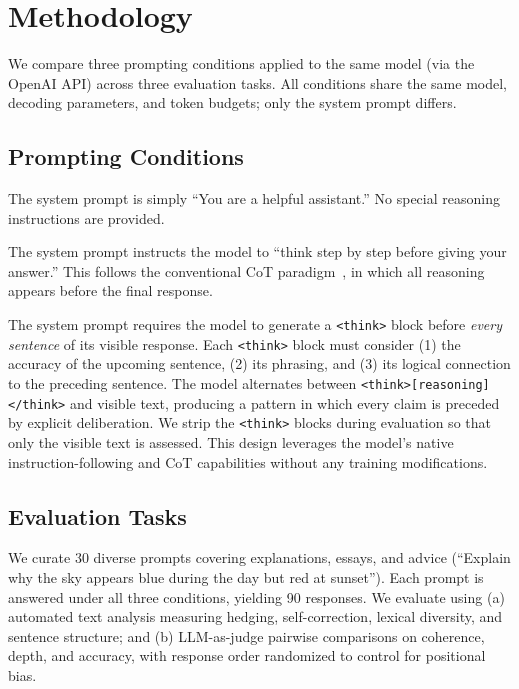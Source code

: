 \section{Methodology}
\label{sec:methodology}

We compare three prompting conditions applied to the same model (\gptfour via the OpenAI API) across three evaluation tasks.
All conditions share the same model, decoding parameters, and token budgets; only the system prompt differs.

\subsection{Prompting Conditions}
\label{sec:conditions}

The system prompt is simply ``You are a helpful assistant.'' No special reasoning instructions are provided.

The system prompt instructs the model to ``think step by step before giving your answer.'' This follows the conventional CoT paradigm~\citep{wei2022chain}, in which all reasoning appears before the final response.

The system prompt requires the model to generate a \texttt{<think>} block before \emph{every sentence} of its visible response.
Each \texttt{<think>} block must consider (1) the accuracy of the upcoming sentence, (2) its phrasing, and (3) its logical connection to the preceding sentence.
The model alternates between \texttt{<think>[reasoning]</think>} and visible text, producing a pattern in which every claim is preceded by explicit deliberation.
We strip the \texttt{<think>} blocks during evaluation so that only the visible text is assessed.
This design leverages the model's native instruction-following and CoT capabilities without any training modifications.

\subsection{Evaluation Tasks}
\label{sec:tasks}

We curate 30 diverse prompts covering explanations, essays, and advice (\eg ``Explain why the sky appears blue during the day but red at sunset'').
Each prompt is answered under all three conditions, yielding 90 responses.
We evaluate using (a) automated text analysis measuring hedging, self-correction, lexical diversity, and sentence structure; and (b) LLM-as-judge pairwise comparisons on coherence, depth, and accuracy, with response order randomized to control for positional bias.


